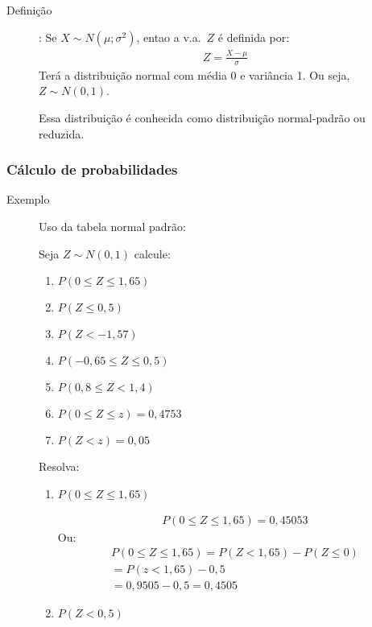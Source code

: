 \begin{description}
\item [Definição]: Se $X \sim N(\mu; \sigma^2)$, entao a v.a.\ $Z$ é definida por:
  \begin{align}
   Z= \frac{X-\mu}{\sigma} 
  \end{align}
  Terá a distribuição normal com média 0 e variância 1. Ou seja, $Z \sim N(0,1)$.
  
  Essa distribuição é conhecida como distribuição normal-padrão ou reduzida. 
\end{description}
  \subsubsection{Cálculo de probabilidades}
  \begin{description}
    \item [Exemplo] Uso da tabela normal padrão:

      Seja $Z\sim N(0,1)$ calcule:
      \begin{enumerate}[label=(\alph*)]
        \item $P(0 \leq Z \leq 1,65)$
        \item $P(Z \leq 0,5)$
        \item $P(Z < -1,57)$
        \item $P(-0,65 \leq Z \leq 0,5)$
        \item $P(0,8 \leq Z < 1,4)$
        \item $P(0 \leq Z \leq z)=0,4753$
        \item $P(Z < z)=0,05$
      \end{enumerate}
      
      Resolva:
\begin{enumerate}[label=(\alph*)]
        \item $P(0 \leq Z \leq 1,65)$
          \begin{figure}[H]
            \centering
            
          \end{figure}
        \begin{align*}          P(0 \leq Z \leq 1,65)= 0,45053 \end{align*}
          Ou:
          \begin{align*}
          P(0 \leq Z \leq 1,65)= P(Z < 1,65)-P(Z \leq 0) \\
          = P(z < 1,65)- 0,5 \\
          = 0,9505 - 0,5 = 0,4505
        \end{align*}
      \item $P(Z < 0,5)$


\end{enumerate}
\end{description}
